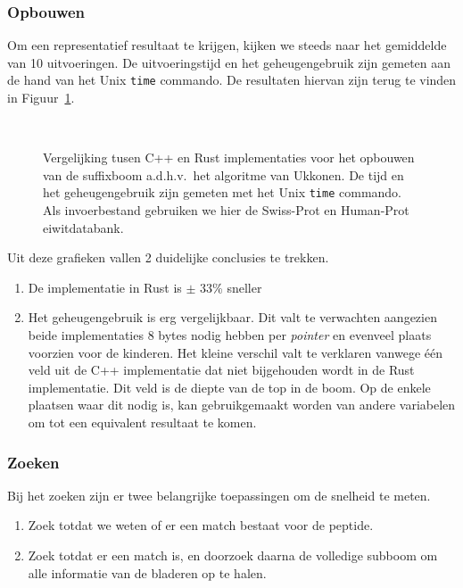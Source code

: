 \subsubsection{Opbouwen}
Om een representatief resultaat te krijgen, kijken we steeds naar het gemiddelde van 10 uitvoeringen.
De uitvoeringstijd en het geheugengebruik zijn gemeten aan de hand van het Unix \texttt{time} commando.
De resultaten hiervan zijn terug te vinden in Figuur~\ref{fig:tree_building}.
\begin{figure}[H]
    \centering
    \\[4ex] %

    \caption{Vergelijking tusen C++ en Rust implementaties voor het opbouwen van de suffixboom a.d.h.v.~het algoritme van Ukkonen. De tijd en het geheugengebruik zijn gemeten met het Unix \texttt{time} commando. Als invoerbestand gebruiken we hier de Swiss-Prot en Human-Prot eiwitdatabank.}\label{fig:tree_building}
\end{figure}

Uit deze grafieken vallen 2 duidelijke conclusies te trekken.
\begin{enumerate}
    \item De implementatie in Rust is $\pm$ 33\% sneller
    \item Het geheugengebruik is erg vergelijkbaar.
    Dit valt te verwachten aangezien beide implementaties 8 bytes nodig hebben per \textit{pointer} en evenveel plaats voorzien voor de kinderen.
    Het kleine verschil valt te verklaren vanwege één veld uit de C++ implementatie dat niet bijgehouden wordt in de Rust implementatie.
    Dit veld is de diepte van de top in de boom.
    Op de enkele plaatsen waar dit nodig is, kan gebruikgemaakt worden van andere variabelen om tot een equivalent resultaat te komen.
\end{enumerate}

\subsubsection{Zoeken}
Bij het zoeken zijn er twee belangrijke toepassingen om de snelheid te meten.
\begin{enumerate}
    \item Zoek totdat we weten of er een match bestaat voor de peptide.
    \item Zoek totdat er een match is, en doorzoek daarna de volledige subboom om alle informatie van de bladeren op te halen.

\end{enumerate}

